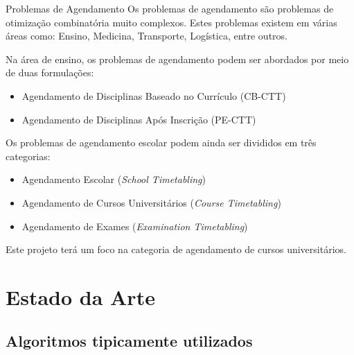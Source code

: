 \documentclass[11]{beamer}
\begin{document}
    \begin{frame}{Problemas de Agendamento}
        \justifying
        Os problemas de agendamento são problemas de otimização combinatória muito complexos. Estes problemas existem em várias áreas como: Ensino, Medicina, Transporte, Logística, entre outros.

        \vspace{.5em}
        Na área de ensino, os problemas de agendamento podem ser abordados por meio de duas formulações:
        
        \vspace{.5em}
        \begin{itemize}
            \item Agendamento de Disciplinas Baseado no Currículo (CB-CTT)
            \item Agendamento de Disciplinas Após Inscrição (PE-CTT)
        \end{itemize}
    \end{frame}

    \begin{frame}
        Os problemas de agendamento escolar podem ainda ser divididos em três categorias:

        \vspace{.5em}
        \begin{itemize}
            \item Agendamento Escolar (\textit{School Timetabling})
            \item Agendamento de Cursos Universitários (\textit{Course Timetabling})
            \item Agendamento de Exames (\textit{Examination Timetabling})
        \end{itemize}
        \vspace{.5em}

        Este projeto terá um foco na categoria de agendamento de cursos universitários.
    \end{frame}

    \section{Estado da Arte}

    \subsection{Algoritmos tipicamente utilizados}
\end{document}
